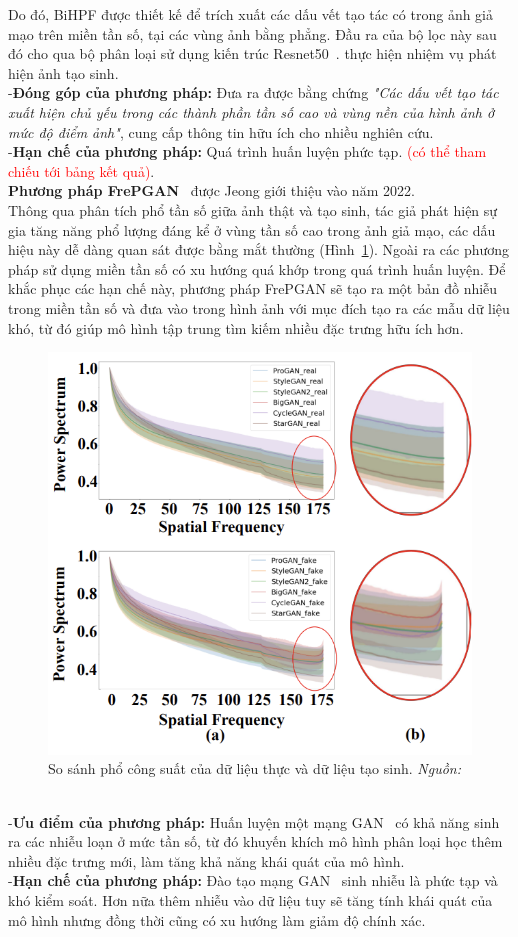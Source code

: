 Do đó, BiHPF được thiết kế để trích xuất các dấu vết tạo tác có trong ảnh giả mạo trên miền tần số, tại các vùng ảnh bằng phẳng. Đầu ra của bộ lọc này sau đó cho qua bộ phân loại sử dụng kiến trúc Resnet50~\cite{He2015DeepRL}. thực hiện nhiệm vụ phát hiện ảnh tạo sinh.\\
%
-\textbf{Đóng góp của phương pháp:}
Đưa ra được bằng chứng \textit{"Các dấu vết tạo tác xuất hiện chủ yếu trong các thành phần tần số cao và vùng nền của hình ảnh ở mức độ điểm ảnh"}, cung cấp thông tin hữu ích cho nhiều nghiên cứu.\\
%
-\textbf{Hạn chế của phương pháp:}
Quá trình huấn luyện phức tạp. \textcolor{red}{(có thể tham chiếu tới bảng kết quả)}.\\
%
\textbf{Phương pháp FrePGAN}~\cite{Jeong2022FrePGANRD} được Jeong giới thiệu vào năm 2022.\\
Thông qua phân tích phổ tần số giữa ảnh thật và tạo sinh, tác giả phát hiện sự gia tăng năng phổ lượng đáng kể ở vùng tần số cao trong ảnh giả mạo, các dấu hiệu này dễ dàng quan sát được bằng mắt thường (Hình~\ref{fig:freqgan-power-spectrum-1}). Ngoài ra các phương pháp sử dụng miền tần số có xu hướng quá khớp trong quá trình huấn luyện. Để khắc phục các hạn chế này, phương pháp FrePGAN sẽ tạo ra một bản đồ nhiễu trong miền tần số và đưa vào trong hình ảnh với mục đích tạo ra các mẫu dữ liệu khó, từ đó giúp mô hình tập trung tìm kiếm nhiều đặc trưng hữu ích hơn. 
%
\begin{figure}[h]
	\centering
	\includegraphics[width=0.7\linewidth]{Images/freqgan-power-spectrum-1.png}
	\begin{minipage}{0.9\linewidth}
		\caption{So sánh phổ công suất của dữ liệu thực và dữ liệu tạo sinh. \textit{Nguồn: \cite{Jeong2022FrePGANRD}}}
		\label{fig:freqgan-power-spectrum-1}
	\end{minipage}
\end{figure}\\
%
-\textbf{Ưu điểm của phương pháp:} Huấn luyện một mạng GAN~\cite{Goodfellow2014GenerativeAN} có khả năng sinh ra các nhiễu loạn ở mức tần số, từ đó khuyến khích mô hình phân loại học thêm nhiều đặc trưng mới, làm tăng khả năng khái quát của mô hình.\\
-\textbf{Hạn chế của phương pháp:} Đào tạo mạng GAN~\cite{Goodfellow2014GenerativeAN} sinh nhiễu là phức tạp và khó kiểm soát. Hơn nữa thêm nhiễu vào dữ liệu tuy sẽ tăng tính khái quát của mô hình nhưng đồng thời cũng có xu hướng làm giảm độ chính xác.
%
%
%
